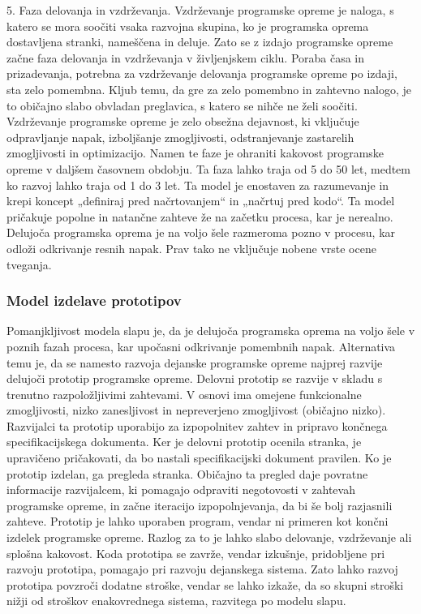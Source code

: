 \documentclass[a4paper,12pt,openright]{book}
\begin{document}
5. Faza delovanja in vzdrževanja. Vzdrževanje programske opreme je naloga, s katero se mora soočiti vsaka razvojna skupina, ko je programska oprema dostavljena stranki, nameščena in deluje. Zato se z izdajo programske opreme začne faza delovanja in vzdrževanja v življenjskem ciklu.
Poraba časa in prizadevanja, potrebna za vzdrževanje delovanja programske opreme po izdaji, sta zelo pomembna. Kljub temu, da gre za zelo pomembno in zahtevno nalogo, je to običajno slabo obvladan preglavica, s katero se nihče ne želi soočiti.
Vzdrževanje programske opreme je zelo obsežna dejavnost, ki vključuje odpravljanje napak, izboljšanje zmogljivosti, odstranjevanje zastarelih zmogljivosti in optimizacijo. Namen te faze je ohraniti kakovost programske opreme v daljšem časovnem obdobju. Ta faza lahko traja od 5 do 50 let, medtem ko razvoj lahko traja od 1 do 3 let.
Ta model je enostaven za razumevanje in krepi koncept „definiraj pred načrtovanjem“ in „načrtuj pred kodo“. Ta model pričakuje popolne in natančne zahteve že na začetku procesa, kar je nerealno. Delujoča programska oprema je na voljo šele razmeroma pozno v procesu, kar odloži odkrivanje resnih napak. Prav tako ne vključuje nobene vrste ocene tveganja.
\cite{alshamrani2015comparison, aggarwal2005software}

\subsubsection{Model izdelave prototipov}

Pomanjkljivost modela slapu je, da je delujoča programska oprema na voljo šele v poznih fazah procesa, kar upočasni odkrivanje pomembnih napak. Alternativa temu je, da se namesto razvoja dejanske programske opreme najprej razvije delujoči prototip programske opreme. Delovni prototip se razvije v skladu s trenutno razpoložljivimi zahtevami. V osnovi ima omejene funkcionalne zmogljivosti, nizko zanesljivost in nepreverjeno zmogljivost (običajno nizko).
Razvijalci ta prototip uporabijo za izpopolnitev zahtev in pripravo končnega specifikacijskega dokumenta. Ker je delovni prototip ocenila stranka, je upravičeno pričakovati, da bo nastali specifikacijski dokument pravilen. Ko je prototip izdelan, ga pregleda stranka. Običajno ta pregled daje povratne informacije razvijalcem, ki pomagajo odpraviti negotovosti v zahtevah programske opreme, in začne iteracijo izpopolnjevanja, da bi še bolj razjasnili zahteve.
Prototip je lahko uporaben program, vendar ni primeren kot končni izdelek programske opreme. Razlog za to je lahko slabo delovanje, vzdrževanje ali splošna kakovost. Koda prototipa se zavrže, vendar izkušnje, pridobljene pri razvoju prototipa, pomagajo pri razvoju dejanskega sistema. Zato lahko razvoj prototipa povzroči dodatne stroške, vendar se lahko izkaže, da so skupni stroški nižji od stroškov enakovrednega sistema, razvitega po modelu slapu.
\end{document}
